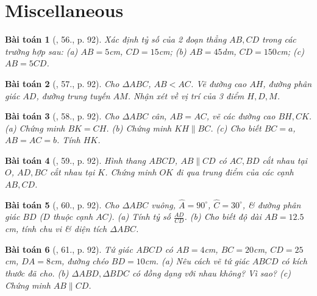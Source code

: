 \documentclass{article}
\newtheorem{baitoan}{Bài toán}
\begin{document}
\section{Miscellaneous}

\begin{baitoan}[\cite{SGK_Toan_8_tap_2}, 56., p. 92]
	Xác định tỷ số của 2 đoạn thẳng $AB,CD$ trong các trường hợp sau: (a) $AB = 5$\emph{cm}, $CD = 15$\emph{cm}; (b) $AB = 45$\emph{dm}, $CD = 150$\emph{cm}; (c) $AB = 5CD$.
\end{baitoan}

\begin{baitoan}[\cite{SGK_Toan_8_tap_2}, 57., p. 92]
	Cho $\Delta ABC$, $AB < AC$. Vẽ đường cao $AH$, đường phân giác $AD$, đường trung tuyến $AM$. Nhận xét về vị trí của 3 điểm $H,D,M$.
\end{baitoan}

\begin{baitoan}[\cite{SGK_Toan_8_tap_2}, 58., p. 92]
	Cho $\Delta ABC$ cân, $AB = AC$, vẽ các đường cao $BH,CK$. (a) Chứng minh $BK = CH$. (b) Chứng minh $KH\parallel BC$. (c) Cho biết $BC = a$, $AB = AC = b$. Tính $HK$.
\end{baitoan}

\begin{baitoan}[\cite{SGK_Toan_8_tap_2}, 59., p. 92]
	Hình thang $ABCD$, $AB\parallel CD$ có $AC,BD$ cắt nhau tại $O$, $AD,BC$ cắt nhau tại $K$. Chứng minh $OK$ đi qua trung điểm của các cạnh $AB,CD$.
\end{baitoan}

\begin{baitoan}[\cite{SGK_Toan_8_tap_2}, 60., p. 92]
	Cho $\Delta ABC$ vuông, $\widehat{A} = 90^\circ$, $\widehat{C} = 30^\circ$, \& đường phân giác $BD$ ($D$ thuộc cạnh $AC$). (a) Tính tỷ số $\frac{AD}{CD}$. (b) Cho biết độ dài $AB = 12.5$\emph{cm}, tính chu vi \& diện tích $\Delta ABC$.
\end{baitoan}

\begin{baitoan}[\cite{SGK_Toan_8_tap_2}, 61., p. 92]
	Tứ giác $ABCD$ có $AB = 4$\emph{cm}, $BC = 20$\emph{cm}, $CD = 25$\emph{cm}, $DA = 8$\emph{cm}, đường chéo $BD = 10$\emph{cm}. (a) Nêu cách vẽ tứ giác $ABCD$ có kích thước đã cho. (b) $\Delta ABD,\Delta BDC$ có đồng dạng với nhau không? Vì sao? (c) Chứng minh $AB\parallel CD$.	
\end{baitoan}


\printbibliography[heading=bibintoc]
	
\end{document}
